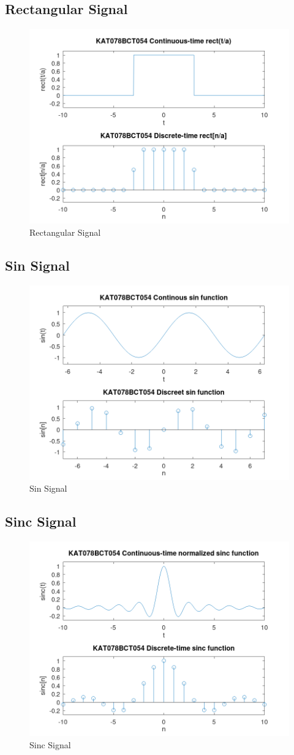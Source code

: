 \subsection*{Rectangular Signal}
    
    \begin{figure}[h]
        \centering
        \includegraphics[width=0.6\linewidth]{figures/rect.png}
        \caption{Rectangular Signal}
        \label{rect}
    \end{figure}
\newpage
\subsection*{Sin Signal}
    
    \begin{figure}[h]
        \centering
        \includegraphics[width=0.7\linewidth]{figures/sin.png}
        \caption{Sin Signal}
        \label{sin}
    \end{figure}
\newpage
\subsection*{Sinc Signal}
    
    \begin{figure}[h]
        \centering
        \includegraphics[width=0.7\linewidth]{figures/sinc.png}
        \caption{Sinc Signal}
        \label{sinc}
    \end{figure}
\newpage